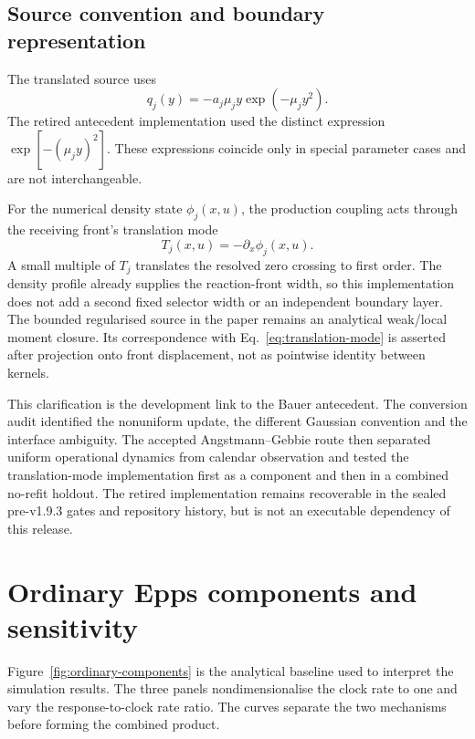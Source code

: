 \documentclass[11pt]{article}
\begin{document}
\subsection{Source convention and boundary representation}

The translated source uses
\begin{equation}
q_j(y)=-a_j\mu_j y\exp(-\mu_j y^2).
\end{equation}
The retired antecedent implementation used the distinct expression
\(\exp[-(\mu_j y)^2]\). These expressions coincide only in special parameter
cases and are not interchangeable.

For the numerical density state \(\phi_j(x,u)\), the production coupling acts
through the receiving front's translation mode
\begin{equation}
T_j(x,u)=-\partial_x\phi_j(x,u).
\label{eq:translation-mode}
\end{equation}
A small multiple of \(T_j\) translates the resolved zero crossing to first
order. The density profile already supplies the reaction-front width, so this
implementation does not add a second fixed selector width or an independent
boundary layer. The bounded regularised source in the paper remains an
analytical weak/local moment closure. Its correspondence with
Eq.~\eqref{eq:translation-mode} is asserted after projection onto front
displacement, not as pointwise identity between kernels.

This clarification is the development link to the Bauer antecedent. The
conversion audit identified the nonuniform update, the different Gaussian
convention and the interface ambiguity. The accepted Angstmann--Gebbie route
then separated uniform operational dynamics from calendar observation and
tested the translation-mode implementation first as a component and then in a
combined no-refit holdout. The retired implementation remains recoverable in
the sealed pre-v1.9.3 gates and repository history, but is not an executable
dependency of this release.

\section{Ordinary Epps components and sensitivity}

Figure~\ref{fig:ordinary-components} is the analytical baseline used to interpret the simulation results. The three panels nondimensionalise the clock rate to one and vary the response-to-clock rate ratio. The curves separate the two mechanisms before forming the combined product.
\end{document}
